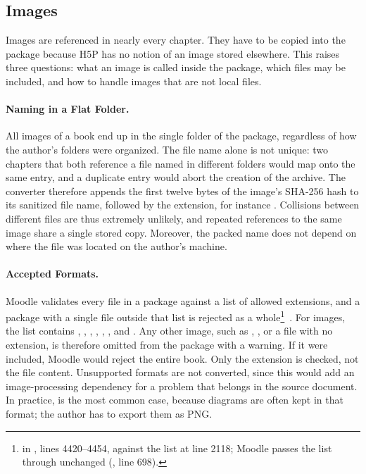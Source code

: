 \subsection{Images}
\label{sec:sec_images}

Images are referenced in nearly every chapter. They have to be copied into the package because
H5P has no notion of an image stored elsewhere.
This raises three questions: what an image is called inside the package, which files may be
included, and how to handle images that are not local files.

\paragraph{Naming in a Flat Folder.}
All images of a book end up in the single folder  of the package, regardless of
how the author's folders were organized.
The file name alone is not unique: two chapters that both reference a file named
 in different folders would map onto the same entry, and a duplicate entry would abort the creation of the
archive.
The converter therefore appends the first twelve bytes of the image's SHA-256 hash to its sanitized file name,
followed by the extension, for instance .
Collisions between different files are thus extremely unlikely, and repeated references to the same
image share a single stored copy.
Moreover, the packed name does not depend on where the file was located on the author's machine.


\paragraph{Accepted Formats.}
Moodle validates every file in a package against a list of allowed extensions, and a package with a
single file outside that list is rejected as a
whole\footnote{\raggedright {} in , lines 4420--4454, against
the list  at line 2118; Moodle passes the list through
unchanged (, line 698).}~\cite{H5P:PhpLibrary}.
For images, the list contains , , , , ,
, and .
Any other image, such as , , or a file with no extension, is therefore omitted from the
package with a warning.
If it were included, Moodle would reject the entire book.
Only the extension is checked, not the file content. Unsupported formats are not converted,
since this would add an image-processing dependency for a problem that belongs in the source
document.
In practice,  is the most common case, because diagrams are often kept in that format;
the author has to export them as PNG.

